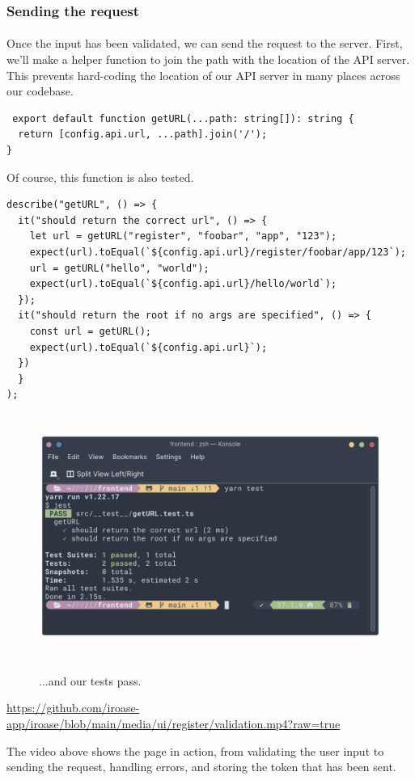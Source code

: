 \documentclass{report}
\begin{document}
\subsubsection{Sending the request}
\paragraph{}
Once the input has been validated, we can send the request to the server. First, we'll make a helper function to join the path with the location of the API server. This prevents hard-coding the location of our API server in many places across our codebase.

\begin{verbatim}
 export default function getURL(...path: string[]): string {
  return [config.api.url, ...path].join('/');
}
\end{verbatim}
Of course, this function is also tested.
\begin{verbatim}
describe("getURL", () => {
  it("should return the correct url", () => {
    let url = getURL("register", "foobar", "app", "123");
    expect(url).toEqual(`${config.api.url}/register/foobar/app/123`);
    url = getURL("hello", "world");
    expect(url).toEqual(`${config.api.url}/hello/world`);
  });
  it("should return the root if no args are specified", () => {
    const url = getURL();
    expect(url).toEqual(`${config.api.url}`);
  })
  }
);
\end{verbatim}
\begin{figure}[H]
  \centering
  \includegraphics[height=8cm]{./media/development/frontend/tests/unit/getURL.png}
  \label{fig:getURL1}
  \caption{...and our tests pass.}
\end{figure}
\href{https://github.com/iroase-app/iroase/blob/main/media/ui/register/validation.mp4?raw=true}{https://github.com/iroase-app/iroase/blob/main/media/ui/register/validation.mp4?raw=true}

The video above shows the page in action, from validating the user input to sending the request, handling errors, and storing the token that has been sent.

\printbibliography
\end{document}
